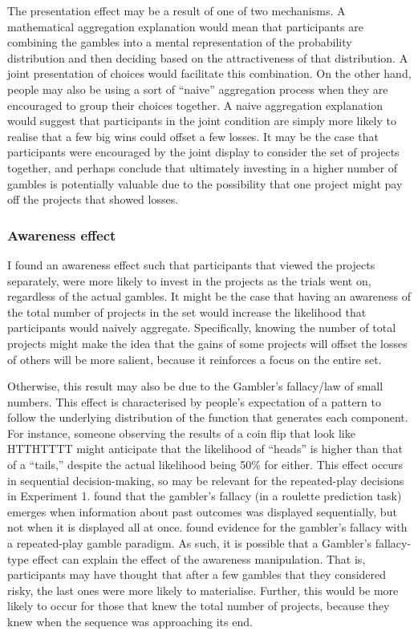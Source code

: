 \documentclass[a4paper, nobind, dvipsnames]{templates/ociamthesis}
\theoremstyle{definition}
\theoremstyle{definition}
\theoremstyle{definition}
\theoremstyle{definition}
\theoremstyle{remark}
\begin{document}
The presentation effect may be a result of one of two mechanisms. A mathematical
aggregation explanation would mean that participants are combining the gambles
into a mental representation of the probability distribution and then deciding
based on the attractiveness of that distribution. A joint presentation of
choices would facilitate this combination. On the other hand, people may also be
using a sort of ``naive'' aggregation process when they are encouraged to group
their choices together. A naive aggregation explanation would suggest that
participants in the joint condition are simply more likely to realise that a few
big wins could offset a few losses. It may be the case that participants were
encouraged by the joint display to consider the set of projects together, and
perhaps conclude that ultimately investing in a higher number of gambles is
potentially valuable due to the possibility that one project might pay off the
projects that showed losses.

\subsubsection{Awareness effect}

I found an awareness effect such that participants that viewed the projects
separately, were more likely to invest in the projects as the trials went on,
regardless of the actual gambles. It might be the case that having an awareness
of the total number of projects in the set would increase the likelihood that
participants would naively aggregate. Specifically, knowing the number of total
projects might make the idea that the gains of some projects will offset the
losses of others will be more salient, because it reinforces a focus on the
entire set.

Otherwise, this result may also be due to the Gambler's fallacy/law of small
numbers. This effect is characterised by people's expectation of a pattern to
follow the underlying distribution of the function that generates each
component. For instance, someone observing the results of a coin flip that look
like HTTHTTTT might anticipate that the likelihood of ``heads'' is higher than
that of a ``tails,'' despite the actual likelihood being 50\% for either. This
effect occurs in sequential decision-making, so may be relevant for the
repeated-play decisions in Experiment 1. \textcite{barron2010} found that the gambler's
fallacy (in a roulette prediction task) emerges when information about past
outcomes was displayed sequentially, but not when it is displayed all at once.
\textcite{haisley2008} found evidence for the gambler's fallacy with a repeated-play
gamble paradigm. As such, it is possible that a Gambler's fallacy-type effect
can explain the effect of the awareness manipulation. That is, participants may
have thought that after a few gambles that they considered risky, the last ones
were more likely to materialise. Further, this would be more likely to occur for
those that knew the total number of projects, because they knew when the
sequence was approaching its end.
\end{document}

